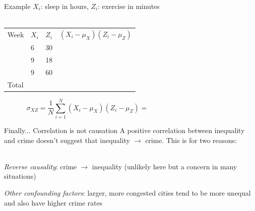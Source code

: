 \documentclass{./../div_teaching_slides}
\begin{document}
\begin{frame}{Example}
\vspace{-0.25em}
$X_i$: sleep in hours, $Z_i$: exercise in minutes \\~\\
\begin{tabularx}{1\textwidth}{P{1.5cm}P{1.5cm}P{1.5cm}Y}
\hline \addlinespace[0.5em]
Week & $X_i$ & $Z_i$ & $(X_i-\mu_X)(Z_i-\mu_Z)$   \\ \addlinespace[0.5em] \hline {} & 6 & 30 &    \\ \hline {} & 9 & 18 &    \\ \hline {} & 9 & 60 &    \\ \hline \addlinespace[0.5em]
 Total & & & \\
 \hline 
\end{tabularx} 
$$ \sigma_{XZ} = \frac{1}{N}\sum_{i=1}^N (X_i-\mu_X)(Z_i-\mu_Z) = \hspace{5cm} $$
\end{frame}


\begin{frame}{Finally... Correlation is not causation}
A positive correlation between inequality and crime doesn't suggest that inequality $\rightarrow$ crime. This is for two reasons: \\~\\
\begin{witemize}
  \item \textit{Reverse causality}: crime $\rightarrow$ inequality (unlikely here but a concern in many situations)
  \item \textit{Other confounding factors}: larger, more congested cities tend to be more unequal and also have higher crime rates
\end{witemize}
\end{frame}


\end{document}

